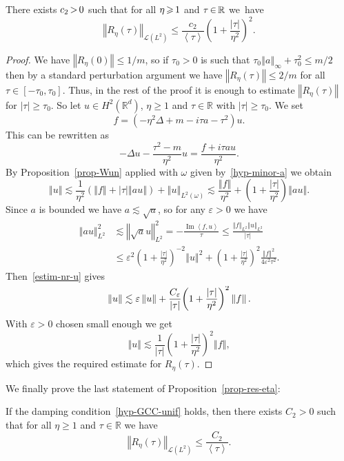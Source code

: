 \documentclass[10pt]{amsart}
\theoremstyle{definition}\newtheorem{defi}[theo]{Definition}\newtheorem{rema}[theo]{Remark}\newtheorem{exam}[theo]{Example}\newtheorem{exem}[theo]{Example}\newtheorem{nota}[theo]{Notation}
\newcommand{\abs}[1]{\left\vert #1\right\vert}
\newcommand{\nr}[1]{\left\Vert #1\right\Vert}
\newcommand{\innp}[2]{\left< #1, #2 \right>}
\newcommand{\pppg}[1] {\left< #1 \right>}
\renewcommand{\leq}{\leqslant}
\renewcommand{\geq}{\geqslant}
\newcommand{\1}{\mathds 1}
\DeclareMathOperator{\Imop}{Im}
\renewcommand{\Im}{\Imop}
\newcommand{\R}{\mathbb{R}}
\newcommand{\D}{\Delta}
\newcommand{\e}{\varepsilon}
\renewcommand{\t}{\tau}
\renewcommand{\o}{\omega}
\newcommand{\Lc}{{\mathcal L}}
\newcommand*{\Mk}{\mkern -2mu}
\begin{document}
\begin{prop}\label{prop-estim-Reta}
There exists $c_2 \Mk>\Mk 0$ such that for all $\eta \Mk\geq\Mk 1$ and $\t \Mk\in\Mk \R$ we~have
\[
\nr{R_\eta(\t)}_{\Lc(L^2)} \leq \frac {c_2}{\pppg \tau} \left(1 + \frac {\abs \t}{\eta^2} \right)^2.
\]
\end{prop}

\begin{proof}
We have $\nr{R_\eta(0)} \leq 1/m$, so if $\t_0 > 0$ is such that $\t_0 \nr{a}_\infty + \t_0^2 \leq m/2$ then by a standard perturbation argument we have $\nr{R_\eta(\t)} \leq 2/m$ for all $\t \in [-\t_0,\t_0]$. Thus, in the rest of the proof it is enough to estimate $\nr{R_\eta(\t)}$ for $\abs \t \geq \t_0$. So let $u \in H^2(\R^d)$, $\eta \geq 1$ and $\t \in \R$ with $\abs \t \geq \t_0$. We set
\begin{equation*}
f = (-\eta^2 \D + m - i \t a - \t^2) u.
\end{equation*}
This can be rewritten as
\[
-\D u - \frac {\t^2-m} {\eta^2} u = \frac{f + i\t a u}{\eta^2}.
\]
By Proposition~\ref{prop-Wun} applied with $\o$ given by~\eqref{hyp-minor-a} we obtain
\begin{equation}\label{estim-nr-u}
\nr{u} \lesssim \frac 1 {\eta^2} \left(\nr{f} + \abs \t \nr{au} \right) + \nr{u}_{L^2(\o)} \lesssim \frac {\nr{f}}{\eta^2} + \left(1+\frac {\abs \t}{\eta^2} \right) \nr{a u}.
\end{equation}
Since $a$ is bounded we have $a \lesssim \sqrt a$, so for any $\e > 0$ we have
\begin{align*}
\nr{a u}_{L^2}^2 & \lesssim \nr{\sqrt a u}_{L^2}^2 = - \frac {\Im \innp{f}{u}}{\t} \leq \frac {\nr f_{L^2} \nr u_{L^2}} {\abs \t}\\
& \leq \e^2 \left(1 + \frac {\abs \t}{\eta^2} \right)^{-2} \nr{u}^2 + \left(1 + \frac {\abs \t}{\eta^2} \right)^2 \frac {\nr{f}^2}{4\e^2 \tau^2}.
\end{align*}
Then~\eqref{estim-nr-u} gives
\[
\nr{u} \lesssim \e \nr{u} + \frac {C_\e}{\abs \tau} \smash{\left(1 + \frac {\abs \t}{\eta^2} \right)^2} \nr{f}.
\]
With $\e > 0$ chosen small enough we get
\[
\nr{u} \lesssim \frac {1}{\abs \tau} {\left(1 + \frac {\abs \t}{\eta^2} \right)^2}\nr{f},
\]
which gives the required estimate for $R_\eta(\t)$.
\end{proof}


We finally prove the last statement of Proposition~\ref{prop-res-eta}:

\begin{prop}\label{prop-estim-Reta-GCC}
If the damping condition~\eqref{hyp-GCC-unif} holds, then there exists $C_2 > 0$ such that for all $\eta \geq 1$ and $\t \in \R$ we have
\[
\nr{R_\eta(\t)}_{\Lc(L^2)} \leq \frac {C_2} {\pppg \t}.
\]
\end{prop}
\end{document}
